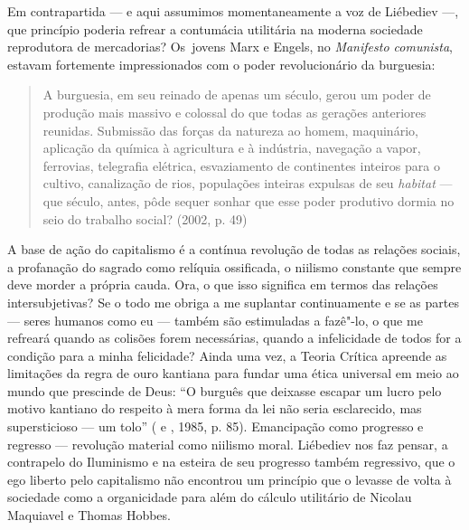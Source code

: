 Em contrapartida --- e aqui assumimos momentaneamente a voz de Liébediev
---, que princípio poderia refrear a contumácia utilitária na moderna
sociedade reprodutora de mercadorias? Os~jovens Marx e Engels, no
\emph{Manifesto comunista}, estavam fortemente impressionados com o
poder revolucionário da burguesia:

\begin{quote}
A burguesia, em seu reinado de apenas um século, gerou um poder de
produção mais massivo e colossal do que todas as gerações anteriores
reunidas. Submissão das forças da natureza ao homem, maquinário,
aplicação da química à agricultura e à indústria, navegação a vapor,
ferrovias, telegrafia elétrica, esvaziamento de continentes inteiros
para o cultivo, canalização de rios, populações inteiras expulsas de seu
\emph{habitat} --- que século, antes, pôde sequer sonhar que esse poder
produtivo dormia no seio do trabalho social? (2002, p. 49)
\end{quote}

A base de ação do capitalismo é a contínua revolução de todas as
relações sociais, a profanação do sagrado como relíquia ossificada, o
niilismo constante que sempre deve morder a própria cauda. Ora, o que
isso significa em termos das relações intersubjetivas? Se o todo me
obriga a me suplantar continuamente e se as partes --- seres humanos como
eu --- também são estimuladas a fazê"-lo, o que me refreará quando as
colisões forem necessárias, quando a infelicidade de todos for a
condição para a minha felicidade? Ainda uma vez, a Teoria Crítica
apreende as limitações da regra de ouro kantiana para fundar uma ética
universal em meio ao mundo que prescinde de Deus: ``O burguês que
deixasse escapar um lucro pelo motivo kantiano do respeito à mera forma
da lei não seria esclarecido, mas supersticioso --- um tolo'' ( e
, 1985, p. 85). Emancipação como progresso e regresso ---
revolução material como niilismo moral. Liébediev nos faz pensar, a
contrapelo do Iluminismo e na esteira de seu progresso também
regressivo, que o ego liberto pelo capitalismo não encontrou um
princípio que o levasse de volta à sociedade como a organicidade para
além do cálculo utilitário de Nicolau Maquiavel e Thomas Hobbes.

